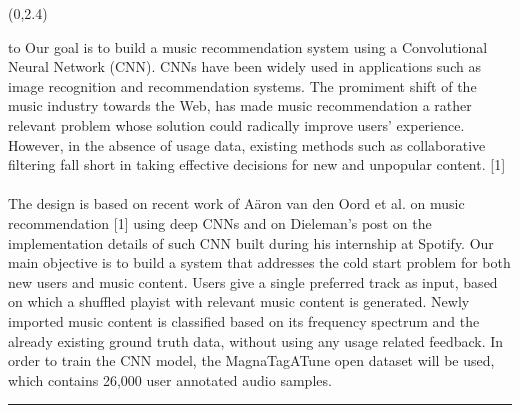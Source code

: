 \documentclass[a0]{a0poster}
\def\Head#1{
  \noindent\hbox to \hsize{\hfil{\LARGE\color{DarkBlue}\sf #1}}\bigskip}
\begin{document}
  \begin{textblock}{7}(0,2.4)
    \Head{Introduction}
    \sf %
    Our goal is to build a music recommendation system using a Convolutional
    Neural Network (CNN). CNNs have been widely used in applications such as
    image recognition and recommendation systems. The promiment shift of the
    music industry towards the Web, has made music recommendation a rather
    relevant problem whose solution could radically improve users' experience.
    However, in the absence of usage data, existing methods such as
    collaborative filtering fall short in taking effective decisions for new
    and unpopular content. [1]
    \\ \\
    The design is based on recent work of A\"{a}ron van den Oord et al. on
    music recommendation [1] using deep CNNs and on Dieleman's post on the
    implementation details of such CNN built during his internship at
    Spotify. Our main objective is to build a system that addresses the cold
    start problem for both new users and music content. Users give a single
    preferred track as input, based on which a shuffled playist with relevant
    music content is generated. Newly imported music content is classified
    based on its frequency spectrum and the already existing ground truth data,
    without using any usage related feedback. In order to train the CNN model,
    the MagnaTagATune open dataset will be used, which contains 26,000 user
    annotated audio samples.

    \bigskip
    \hrule
  \end{textblock}
\end{document}
